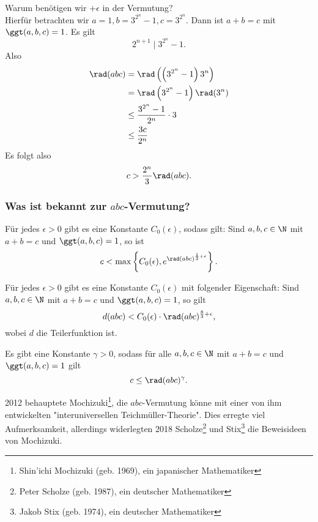 \begin{rem*}
	Warum benötigen wir $+\epsilon$ in der Vermutung?\\
	Hierfür betrachten wir $a=1,b=3^{2^n}-1,c=3^{2^n}$. Dann ist $a+b=c$ mit $\ggt(a,b,c)=1$. Es gilt
	\[ 2^{n+1} \mid 3^{2^n}-1. \]
	Also
	\begin{align*}
		\rad(abc) &= \rad \left( \left( 3^{2^n}-1 \right) 3^n \right)\\
		&= \rad \left( 3^{2^n} -1 \right) \rad(3^n)\\
		&\leq \frac{3^{2^n}-1}{2^n} \cdot 3\\
		&\leq \frac{3c}{2^n}
	\end{align*}
	Es folgt also
	\[ c > \frac{2^n}{3} \rad(abc). \]
\end{rem*}

\subsubsection*{Was ist bekannt zur $abc$-Vermutung?}

\begin{thm*}
	Für jedes \( \epsilon>0 \) gibt es eine Konstante $C_0(\epsilon)$, sodass gilt: Sind $a,b,c \in \N$ mit $a+b=c$ und $\ggt(a,b,c)=1$, so ist
	\[ c < \max \left\{ C_0(\epsilon), e^{\rad(abc)^{\frac{1}{3}+\epsilon}} \right\}. \]
\end{thm*}

\begin{thm*}[Pastén, 2017]
	Für jedes $\epsilon>0$ gibt es eine Konstante $C_0(\epsilon)$ mit folgender Eigenschaft: Sind $a,b,c \in \N$ mit $a+b=c$ und $\ggt(a,b,c)=1$, so gilt
	\[ d(abc) < C_0(\epsilon) \cdot \rad(abc)^{\frac{8}{3}+\epsilon}, \]
	wobei $d$ die Teilerfunktion ist.
\end{thm*}

\begin{conj*}
	Es gibt eine Konstante $\gamma>0$, sodass für alle $a,b,c \in \N$ mit $a+b=c$ und $\ggt(a,b,c)=1$ gilt
	\[ c \leq \rad(abc)^\gamma. \]
\end{conj*}

2012 behauptete Mochizuki\footnote{Shin’ichi Mochizuki (geb. 1969), ein japanischer Mathematiker}, die $abc$-Vermutung könne mit einer von ihm entwickelten "interuniversellen Teichmüller-Theorie". Dies erregte viel Aufmerksamkeit, allerdings widerlegten 2018 Scholze\footnote{Peter Scholze (geb. 1987), ein deutscher Mathematiker} und Stix\footnote{Jakob Stix (geb. 1974), ein deutscher Mathematiker} die Beweisideen von Mochizuki.

